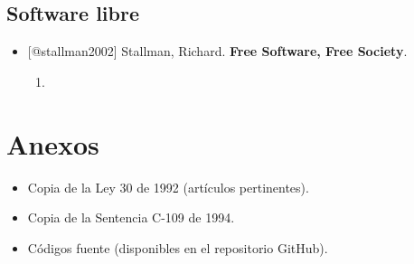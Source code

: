 \documentclass[14pt, a4paper]{article}
\begin{document}
\subsection{Software libre}
\label{ref-software}
\begin{itemize}
\item {[}@stallman2002] Stallman, Richard. \textbf{Free Software, Free Society}.
\begin{enumerate}
\item 
\end{enumerate}
\end{itemize}
\section{Anexos}
\label{anexos}
\begin{itemize}
\item[{$\square$}] Copia de la Ley 30 de 1992 (artículos pertinentes).
\item[{$\square$}] Copia de la Sentencia C-109 de 1994.
\item[{$\square$}] Códigos fuente (disponibles en el repositorio GitHub).
\end{itemize}
\end{document}
